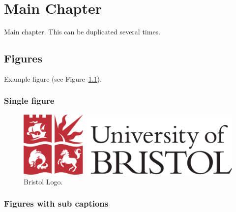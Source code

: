 \chapter{Main Chapter}
\label{ch:mainchapter}

Main chapter. This can be duplicated several times.

\newpage
\minitoc %
\newpage

\section{Figures}

Example figure (see Figure~\ref{fig:Bristollogo}).

\subsection{Single figure}
\begin{figure}[h]
    \centering
    \includegraphics[width=0.8\columnwidth]{images/Logo - colour PNG.png}
    \caption{Bristol Logo.}
    \label{fig:Bristollogo}
\end{figure}

\subsection{Figures with sub captions}

